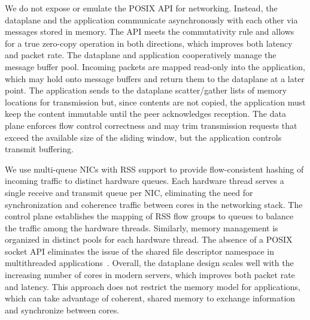  We do
not expose or emulate the POSIX API for networking.  Instead, the
dataplane and the application communicate asynchronously with each
other via messages stored in
memory.%
The API meets the commutativity rule and allows for a true zero-copy
operation in both directions, which improves both latency and packet
rate. The dataplane and application cooperatively manage the message
buffer pool. Incoming packets are mapped read-only into the
application, which may hold onto message buffers and return them to
the dataplane at a later point.  The application sends to the
dataplane scatter/gather lists of memory locations for transmission
but, since contents are not copied, the application must keep the
content immutable until the peer acknowledges reception. The
data plane enforces flow control correctness and may trim transmission
requests that exceed the available size of the sliding window, but
the application controls transmit buffering.

 We use
multi-queue NICs with RSS support to provide flow-consistent hashing
of incoming traffic to distinct hardware queues. Each hardware
thread serves a single receive and transmit queue per NIC, eliminating
the need for synchronization and
coherence traffic between cores in the networking stack.  The control
plane establishes the mapping of RSS flow groups to queues to balance
the traffic among the hardware threads.  Similarly, memory management
is organized in distinct pools for each hardware thread. The absence
of a POSIX socket API eliminates the issue of the shared file
descriptor namespace in multithreaded
applications~\cite{DBLP:conf/sosp/ClementsKZMK13}. Overall, the \ix
dataplane design scales well with the increasing number of cores in
modern servers, which improves both packet rate and latency. This
approach does not restrict the memory model for applications, which
can take advantage of coherent, shared memory to exchange information and
synchronize between cores.

